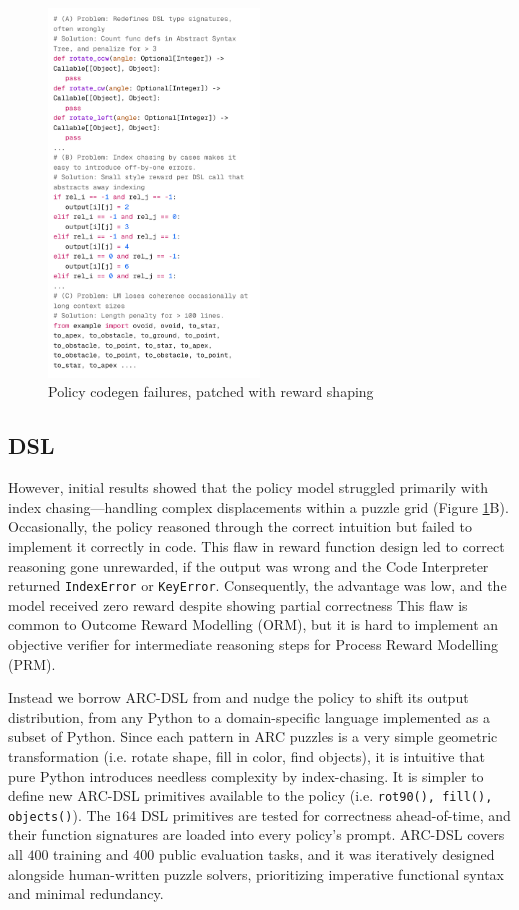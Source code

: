 \documentclass{article}
\begin{document}
\begin{figure}[t]
  \centering
  \includegraphics[width=0.5\textwidth]{bin/failures.png}
  \caption{Policy codegen failures, patched with reward shaping}
  \label{fig:failures}
\end{figure}

\subsection{DSL}

However, initial results showed that the policy model struggled primarily with index chasing—handling complex displacements within a puzzle grid (Figure \ref{fig:failures}B). Occasionally, the policy reasoned through the correct intuition but failed to implement it correctly in code. This flaw in reward function design led to correct reasoning gone unrewarded, if the output was wrong and the Code Interpreter returned \texttt{IndexError} or \texttt{KeyError}. Consequently, the advantage was low, and the model received zero reward despite showing partial correctness This flaw is common to Outcome Reward Modelling (ORM), but it is hard to implement an objective verifier for intermediate reasoning steps for Process Reward Modelling (PRM).

Instead we borrow ARC-DSL from \cite{Hodel} and nudge the policy to shift its output distribution, from any Python to a domain-specific language  implemented as a subset of Python. Since each pattern in ARC puzzles is a very simple geometric transformation (i.e. rotate shape, fill in color, find objects), it is intuitive that pure Python introduces needless complexity by index-chasing. It is simpler to define new ARC-DSL primitives available to the policy (i.e. \texttt{rot90(), fill(), objects()}). The $164$ DSL primitives are tested for correctness ahead-of-time, and their function signatures are loaded into every policy's prompt. ARC-DSL covers all $400$ training and $400$ public evaluation tasks, and it was iteratively designed alongside human-written puzzle solvers, prioritizing imperative functional syntax and minimal redundancy.
\end{document}
